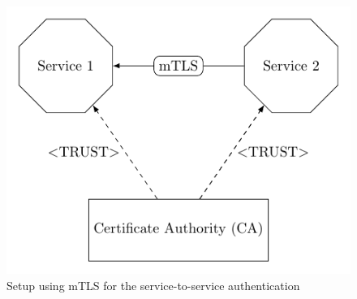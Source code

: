 \begin{figure}
	\centering
	\includegraphics{images/authentication-mechanisms/TikZ_mTLS_base_structure.pdf}
	\caption{Setup using mTLS for the service-to-service authentication~\cite{dias2020microservices}}
	\label{fig:auth_mechanisms_mtls}
\end{figure}

